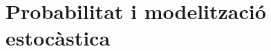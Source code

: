 \documentclass[../../main.tex]{subfiles}
\begin{document}
\part{Probabilitat i modelització estocàstica}





\end{document}
